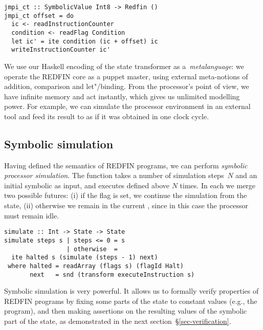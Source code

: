 \vspace{-0.5mm}
\begin{verbatim}
jmpi_ct :: SymbolicValue Int8 -> Redfin ()
jmpi_ct offset = do
  ic <- readInstructionCounter
  condition <- readFlag Condition
  let ic' = ite condition (ic + offset) ic
  writeInstructionCounter ic'
\end{verbatim}

\noindent
We use our Haskell encoding of the state transformer as a~\emph{metalanguage}:
we operate the REDFIN core as a puppet master, using external meta-notions of
addition, comparison and let"/binding. From the processor's
point of view, we have infinite memory and act instantly, which gives us unlimited
modelling power. For example, we can simulate the processor environment
in an external tool and feed its result to  as if it was
obtained in one clock cycle.

\vspace{-1mm}
\subsection{Symbolic simulation}
\vspace{-1mm}

Having defined the semantics of REDFIN programs, we can perform \emph{symbolic
processor simulation}. The function  takes a number of simulation
steps~$N$ and an initial symbolic  as input, and executes
 defined above $N$ times. In each  we
merge two possible futures: (i) if the  flag is set, we continue the
simulation from the  state, (ii) otherwise we remain in the current
, since in this case the processor must remain idle.

\begin{verbatim}
simulate :: Int -> State -> State
simulate steps s | steps <= 0 = s
                 | otherwise  =
  ite halted s (simulate (steps - 1) next)
 where halted = readArray (flags s) (flagId Halt)
       next   = snd (transform executeInstruction s)
\end{verbatim}

\noindent
Symbolic simulation is very powerful. It allows us to formally verify properties
of REDFIN programs by fixing some parts of the state to constant values (e.g.,
the program), and then making assertions on the resulting values of
the symbolic part of the state, as demonstrated in the next
section~\S\ref{sec-verification}.

